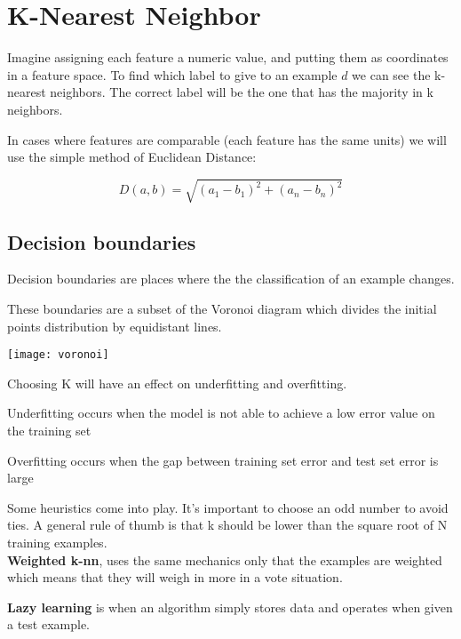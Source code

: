 
\chapter{K-Nearest Neighbor}

Imagine assigning each feature a numeric value, and putting them as coordinates in a feature space. To find which label to give to an example $d$ we can see the k-nearest neighbors. The correct label will be the one that has the majority in k neighbors. 


In cases where features are comparable (each feature has the same units) we will use the simple method of Euclidean Distance: 

\[
D(a,b) = \sqrt{(a_1-b_1)^2+(a_n-b_n)^2}
\]

\section{Decision boundaries}

\begin{definition}
	Decision boundaries are places where the the classification of an example changes.
\end{definition}

These boundaries are a subset of the Voronoi diagram which divides the initial points distribution by equidistant lines. 

\texttt{[image: voronoi]}

Choosing K will have an effect on underfitting and overfitting.

\begin{definition}[Underfitting]
	Underfitting occurs when the model is not able to achieve a low error value on the training set
\end{definition}

\begin{definition}[Overfitting]
	Overfitting occurs when the gap between training set error and test set error is large
\end{definition}

Some heuristics come into play. It's important to choose an odd number to avoid ties. A general rule of thumb is that k should be lower than the square root of N training examples.
\\
\textbf{Weighted k-nn}, uses the same mechanics only that the examples are weighted which means that they will weigh in more in a vote situation.

\textbf{Lazy learning} is when an algorithm simply stores data and operates when given a test example.

